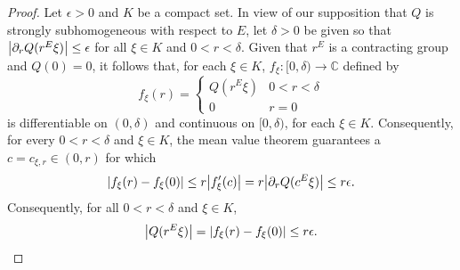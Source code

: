 \documentclass[11pt, letter]{book}
\begin{document}
\begin{proof}
Let $\epsilon>0$ and $K$ be a compact set.  In view of our supposition that $Q$ is strongly subhomogeneous with respect to $E$, let $\delta>0$ be given so that $\abs{\partial_r Q(r^E\xi)}\leq \epsilon$ for all $\xi\in K$ and $0<r< \delta$. Given that $r^E$ is a contracting group and $Q(0)=0$, it follows that, for each $\xi\in K$, $f_{\xi}:[0,\delta)\to\mathbb{C}$ defined by
\begin{equation*}
f_{\xi}(r)=\begin{cases}
Q(r^E\xi) & 0<r<\delta\\
0 & r=0
\end{cases}
\end{equation*}
is differentiable on $(0,\delta)$ and continuous on $[0,\delta)$, for each $\xi\in K$. Consequently, for every $0<r<\delta$ and $\xi\in K$, the mean value theorem guarantees a $c=c_{\xi,r}\in (0,r)$ for which 
\begin{equation*}
\abs{f_{\xi}(r)-f_{\xi}(0)}\leq r\abs{f_{\xi}'(c)}=r\abs{\partial_r Q(c^E\xi)}\leq r\epsilon.
\end{equation*}
Consequently, for all $0<r<\delta$ and $\xi\in K$,
\begin{equation*}
\abs{Q(r^E\xi)}=\abs{f_{\xi}(r)-f_{\xi}(0)}\leq r\epsilon.
\end{equation*}
\end{proof}
\end{document}
